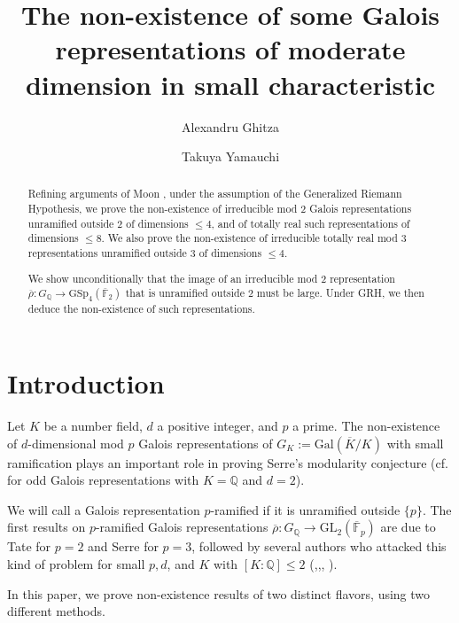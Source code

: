 \documentclass{amsart}
\title[Non-existence of some Galois representations]{The non-existence of some
Galois representations of moderate dimension in small characteristic}
\author{Alexandru Ghitza \and Takuya Yamauchi}
\theoremstyle{definition}
\newcommand{\lra}{\longrightarrow}
\newcommand{\Q}{\mathbb{Q}}
\newcommand{\F}{\mathbb{F}}
\newcommand{\bF}{\overline{\F}}
\newcommand{\br}{\overline{\rho}}
\newcommand{\GSp}{\mathrm{GSp}}
\newcommand{\GL}{\mathrm{GL}}
\newcommand{\Gal}{\mathrm{Gal}}
\renewcommand{\leq}{\leqslant}
\renewcommand{\le}{\leqslant}
\begin{document}
\begin{abstract}
  Refining arguments of Moon \cite{Mo1,Mo2}, under the assumption of the Generalized Riemann Hypothesis, we prove the non-existence of irreducible mod $2$ Galois representations unramified outside $2$ of dimensions $\leq 4$, and of totally real such representations of dimensions $\leq 8$.
  We also prove the non-existence of irreducible totally real mod $3$ representations unramified outside $3$ of dimensions $\leq 4$.

  We show unconditionally that the image of an irreducible mod $2$ representation $\br:G_\Q\lra \GSp_4(\bF_2)$ that is unramified outside $2$ must be large.
  Under GRH, we then deduce the non-existence of such representations.
\end{abstract}

\maketitle

\tableofcontents

\section{Introduction}\label{intro}
%

Let $K$ be a number field, $d$ a positive integer, and $p$ a prime.
The non-existence of $d$-dimensional mod $p$ Galois representations of
$G_K:=\Gal(\overline{K}/K)$ with small ramification plays an important role in proving Serre's modularity conjecture
(cf. \cite{KW} for odd Galois representations with $K=\Q$ and $d=2$).

We will call a Galois representation $p$-ramified if it is unramified outside $\{p\}$.
The first results on $p$-ramified Galois representations $\br:G_\Q\lra \GL_2(\bF_p)$ are due to Tate \cite{Ta} for $p=2$ and Serre \cite{Se1} for $p=3$, followed by several authors who attacked this kind of problem for small $p,d$, and $K$ with $[K:\Q]\le 2$ (\cite{Mo2},\cite{MT},\cite{S}, \cite{GM}).

In this paper, we prove non-existence results of two distinct flavors, using two different methods.
\end{document}
